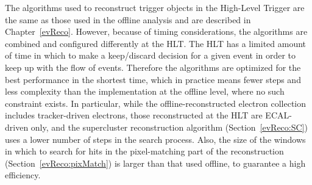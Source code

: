 The algorithms used to reconstruct trigger objects 
in the High-Level Trigger are the same as those 
used in the offline analysis and are described in Chapter~\ref{evReco}.  
However, because of timing considerations, 
the algorithms are combined and configured differently at the HLT.  
The HLT has a limited amount of time in which to 
make a keep/discard decision for a given event 
in order to keep up with the flow of events.  
Therefore the algorithms are optimized for the best 
performance in the shortest time, 
which in practice means fewer steps and less 
complexity than the implementation at the offline level, 
where no such constraint exists.  
In particular, while the offline-reconstructed 
electron collection 
includes tracker-driven electrons, 
those reconstructed at the HLT are ECAL-driven only, 
and the supercluster reconstruction algorithm 
(Section~\ref{evReco:SC}) uses 
a lower number of steps in the search process.  
Also, the size of the windows in which to search for 
hits in the pixel-matching part of the 
reconstruction (Section~\ref{evReco:pixMatch}) 
is larger than that used offline, 
to guarantee a high efficiency.  








